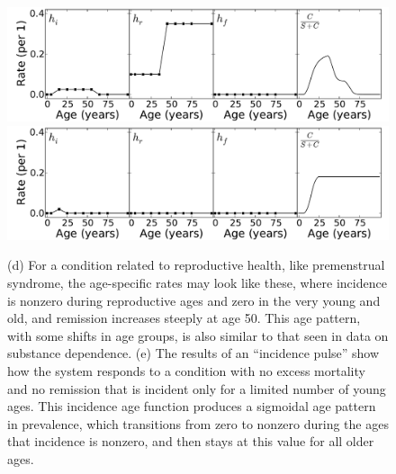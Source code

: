 \begin{figure}
\begin{center}
\includegraphics[width=\textwidth]{forward-sim-reproductive.pdf}
\includegraphics[width=\textwidth]{forward-sim-incidence_pulse.pdf}
\caption{(d) For a condition related to reproductive health, like
  premenstrual syndrome, the age-specific rates may look like these,
  where incidence is nonzero during reproductive ages and zero in
  the very young and old, and remission increases steeply at age
  50. This age pattern, with some shifts in age groups, is also similar
  to that seen in data on substance dependence.
(e) The results of an ``incidence pulse'' show how the system
  responds to a condition with no excess mortality and no remission
  that is incident only for a limited number of young ages.  This
  incidence age function produces a sigmoidal age pattern in
  prevalence, which transitions from zero to nonzero during the ages
  that incidence is nonzero, and then stays at this value for all
  older ages.}
\label{forward-sim-ex3b}
\end{center}
\end{figure}


